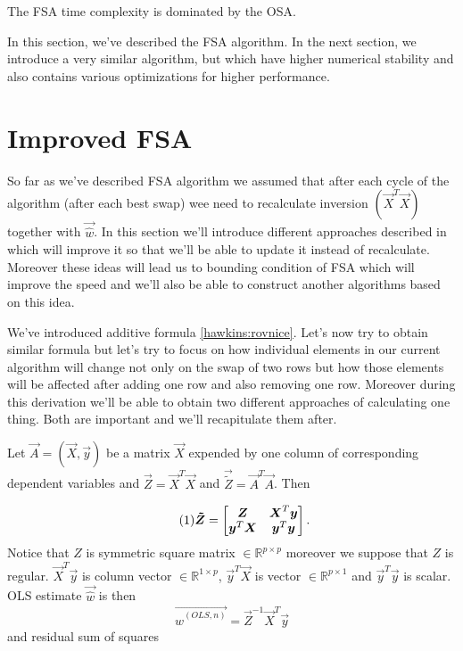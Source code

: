 \begin{observation} 
The FSA time complexity is dominated by the OSA. 
\end{observation} 

In this section, we've described the FSA algorithm. In the next section, we introduce a very similar algorithm, but which have higher numerical stability and also contains various optimizations for higher performance.







\section{Improved FSA} %
So far as we've described FSA algorithm we assumed that after each cycle of the algorithm (after each best swap) wee need to recalculate inversion $(\vec{X}^T\vec{X})$ together with $\vec{\hat{w}}$. In this section we'll introduce different approaches described in \cite{agullo2001new} which will improve it so that we'll be able to update it instead of recalculate. Moreover these ideas will lead us to bounding condition of FSA which will improve the speed and we'll also be able to construct another algorithms based on this idea. 

We've introduced additive formula \ref{hawkins:rovnice}. Let's now try to obtain similar formula but let's try to focus on how individual elements in our current algorithm will change not only on the swap of two rows but how those elements will be affected after adding one row and also removing one row. Moreover during this derivation we'll be able to obtain two different approaches of calculating one thing. Both are important and we'll recapitulate them after.


Let $\vec{A} = (\vec{X}, \vec{y})$ be a matrix $\vec{X}$ expended by one column of corresponding dependent variables and $\vec{Z} = \vec{X}^T\vec{X}$ and $\vec{\tilde{Z}} = \vec{A}^T\vec{A}$. Then

\[  \numberthis \label{matrixZ}
	\vec{\tilde{Z}} = \begin{bmatrix}
		\vec{Z} & \vec{X}^T\vec{y} \\
    \vec{y}^T\vec{X} & \vec{y}^T\vec{y}
  \end{bmatrix} .
\]
Notice that $Z$ is symmetric square matrix $\in \mathbb{R}^ {p \times p}$ moreover we suppose that $Z$ is regular. $\vec{X}^T\vec{y}$ is column vector $\in \mathbb{R}^ {1 \times p}$, $\vec{y}^T\vec{X}$ is vector $\in \mathbb{R}^ {p \times 1}$ and $\vec{y}^T\vec{y}$ is scalar.
OLS estimate $\vec{\hat{w}}$ is then
\begin{equation}
	\vec{\hat{w}^{(OLS, n)}} = \vec{Z}^{-1} \vec{X}^T\vec{y}
\end{equation}
and residual sum of squares 


